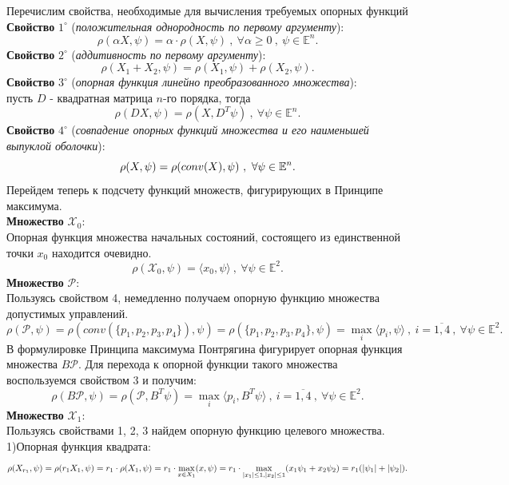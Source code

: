 \documentclass[10pt]{article}
\begin{document}
Перечислим свойства, необходимые для вычисления требуемых опорных функций\medskip\\
\textbf{Свойство} \(1^{\circ}\) (\textit{положительная однородность по первому аргументу}):
\[ \rho( \alpha X, \psi) = \alpha \cdot \rho(X, \psi) \ , \ \forall \alpha \geq 0 \ , \ \psi \in \mathbb{E}^n.\]
\textbf{Свойство} \(2^{\circ}\) (\textit{аддитивность по первому аргументу}):
\[ \rho(X_1 + X_2, \psi) = \rho(X_1, \psi) + \rho(X_2, \psi).\]
\textbf{Свойство} \(3^{\circ}\) (\textit{опорная функция линейно преобразованного множества}):\\
пусть \(D\) - квадратная матрица \(n\)-го порядка, тогда
\[ \rho(DX, \psi) = \rho(X, D^T\psi) \ , \ \forall \psi \in \mathbb{E}^n.\]
\textbf{Свойство} \(4^{\circ}\) (\textit{совпадение опорных функций множества и его наименьшей выпуклой оболочки}):
\[ \rho(X,\psi) = \rho(conv (X), \psi) \ , \ \forall \psi \in \mathbb{E}^n. \bigskip \]
Перейдем теперь к подсчету функций множеств, фигурирующих в Принципе максимума.\medskip\\
\textbf{Множество} \( \mathcal{X}_0\):\smallskip\\
Опорная функция множества начальных состояний, состоящего из единственной точки \(x_0\) находится очевидно.
\[ \rho(\mathcal{X}_0, \psi) = \langle x_0, \psi \rangle \ , \ \forall \psi \in \mathbb{E}^2.\] 
\textbf{Множество} \( \mathcal{P}\):\smallskip\\
Пользуясь свойством 4, немедленно получаем опорную функцию множества допустимых управлений.
\[ \rho(\mathcal{P}, \psi) = \rho(conv(\{p_1, p_2, p_3, p_4\}), \psi) = \rho(\{p_1, p_2, p_3, p_4\}, \psi) = \max\limits_{i} \langle p_i, \psi \rangle \ ,\ i = \overline{1, 4} \ , \ \forall \psi \in \mathbb{E}^2.\] 
В формулировке Принципа максимума Понтрягина фигурирует опорная функция множества \(B \mathcal{P} \). Для перехода к опорной функции такого множества воспользуемся свойством 3 и получим:
\[ \rho(B \mathcal{P}, \psi) = \rho(\mathcal{P}, B^T \psi) = \max\limits_{i} \langle p_i, B^T \psi \rangle \ , \ i = \overline{1,4} \ , \ \forall \psi \in \mathbb{E}^2.\]
\textbf{Множество} \( \mathcal{X}_1\):\smallskip\\
Пользуясь свойствами 1, 2, 3 найдем опорную функцию целевого множества.\medskip\\
1)Опорная функция квадрата: 
\[ \rho (X_{r_1},\psi) = \rho(r_1 X_1, \psi) = r_1 \cdot \rho(X_1, \psi) = r_1 \cdot  \smash{\displaystyle\max_{x \in X_1}} ( x, \psi) = r_1 \cdot \smash{\displaystyle\max_{|x_1| \leq 1, |x_2| \leq 1}}(x_1 \psi_1 + x_2 \psi_2) =  r_1(|\psi_1| + |\psi_2|). \bigskip\]
\end{document}
